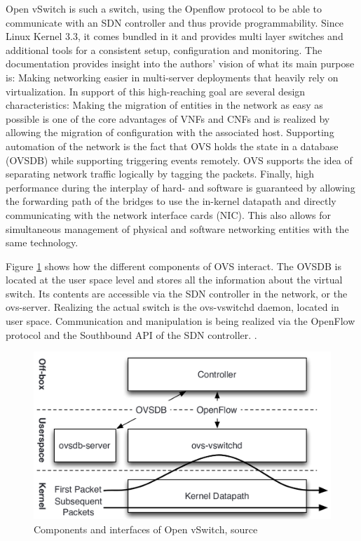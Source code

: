 Open vSwitch is such a switch, using the Openflow protocol to be able to communicate with an SDN controller and thus provide programmability. Since Linux Kernel 3.3, it comes bundled in it and provides multi layer switches and additional tools for a consistent setup, configuration and monitoring. The documentation provides insight into the authors' vision of what its main purpose is: Making networking easier in multi-server deployments that heavily rely on virtualization. In support of this high-reaching goal are several design characteristics: Making the migration of entities in the network as easy as possible is one of the core advantages of VNFs and CNFs and is realized by allowing the migration of configuration with the associated host. Supporting automation of the network is the fact that OVS holds the state in a database (OVSDB) while supporting triggering events remotely. OVS supports the idea of separating network traffic logically by tagging the packets. Finally, high performance during the interplay of hard- and software is guaranteed by allowing the forwarding path of the bridges to use the in-kernel datapath and directly communicating with the network interface cards (NIC). This also allows for simultaneous management of physical and software networking entities with the same technology. 

Figure \ref{img:ovs} shows how the different components of OVS interact. The OVSDB is located at the user space level and stores all the information about the virtual switch. Its contents are accessible via the SDN controller in the network, or the ovs-server.
Realizing the actual switch is the ovs-vswitchd daemon, located in user space. Communication and manipulation is being realized via the OpenFlow protocol and the Southbound API of the SDN controller. 
\cite{openvswitch} \cite{pfaff2015design}. 

\begin{figure}[h]
	\centering
	\includegraphics[width=1\linewidth]{images/openvswitch.png}
	\caption{Components and interfaces of Open vSwitch, source \cite{pfaff2015design}}
	\label{img:ovs}
\end{figure}

